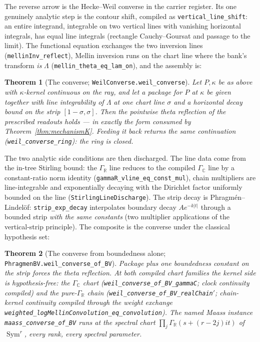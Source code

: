 \documentclass[11pt]{article}
\newtheorem{theorem}{Theorem}
\theoremstyle{definition}
\newcommand{\Sym}{\operatorname{Sym}}
\begin{document}
The reverse arrow is the Hecke--Weil converse in the carrier register.  Its one
genuinely analytic step is the contour shift, compiled as
\texttt{vertical\_line\_shift}: an entire integrand, integrable on two vertical lines
with vanishing horizontal integrals, has equal line integrals (rectangle
Cauchy--Goursat and passage to the limit).  The functional equation exchanges the two
inversion lines (\texttt{mellinInv\_reflect}), Mellin inversion runs on the chart line
where the bank's transform \emph{is} $\Lambda$ (\texttt{mellin\_theta\_eq\_lam\_on}),
and the assembly is:

\begin{theorem}[The converse; \texttt{WeilConverse.weil\_converse}]\label{thm:weil-converse}
Let $P,\kappa$ be as above with $\kappa$-kernel continuous on the ray, and let a
package for $P$ at $\kappa$ be given together with line integrability of $\Lambda$ at
one chart line $\sigma$ and a horizontal decay bound on the strip $[1-\sigma,\sigma]$.
Then the pointwise theta reflection of the prescribed readouts holds --- in exactly the
form consumed by Theorem~\ref{thm:mechanismK}.  Feeding it back returns the same
continuation (\texttt{weil\_converse\_ring}): the ring is closed.
\end{theorem}

The two analytic side conditions are then discharged.  The line data come from the
in-tree Stirling bound: the $\Gamma_{\mathbb R}$ line reduces to the compiled
$\Gamma_{\mathbb C}$ line by a constant-ratio norm identity
(\texttt{gammaR\_vline\_eq\_const\_mul}), chain multipliers are line-integrable and
exponentially decaying with the Dirichlet factor uniformly bounded on the line
(\texttt{StirlingLineDischarge}).  The strip decay is Phragm\'en--Lindel\"of:
\texttt{strip\_exp\_decay} interpolates boundary decay $A e^{-k|t|}$ through a bounded
strip \emph{with the same constants} (two multiplier applications of the vertical-strip
principle).  The composite is the converse under the classical hypothesis set:

\begin{theorem}[The converse from boundedness alone;
\texttt{PhragmenBV.weil\_converse\_of\_BV}]\label{thm:weil-converse-bv}
Package plus \emph{one} boundedness constant on the strip forces the theta reflection.
At both compiled chart families the kernel side is hypothesis-free: the
$\Gamma_{\mathbb C}$ chart (\texttt{weil\_converse\_of\_BV\_gammaC}; clock continuity
compiled) and the pure-$\Gamma_{\mathbb R}$ chain
(\texttt{weil\_converse\_of\_BV\_realChain$'$}; chain-kernel continuity compiled through
the weight exchange \texttt{weighted\_logMellinConvolution\_eq\_convolution}).  The
named Maass instance \texttt{maass\_converse\_of\_BV} runs at the spectral chart
$\prod_j\Gamma_{\mathbb R}(s+(r-2j)it)$ of $\Sym^r$, every rank, every spectral
parameter.
\end{theorem}
\end{document}
